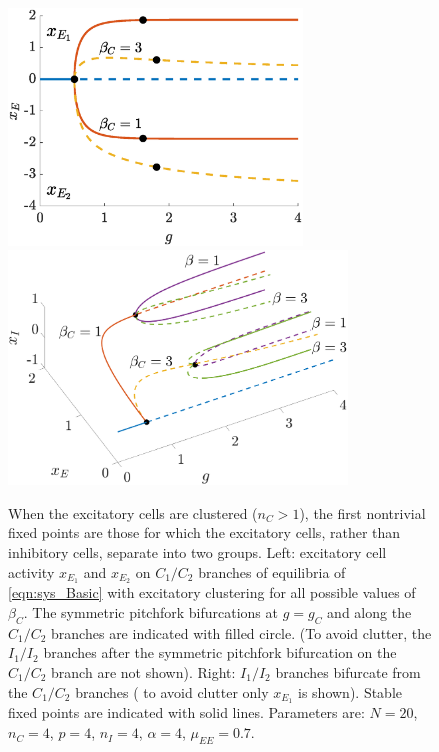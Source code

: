 \documentclass[reqno]{siamonline190516}
\begin{document}
\begin{figure}
    \centering
    \includegraphics[width=7.8cm]{bdclusters20c4E.eps}\hspace{-0.5cm}
    \vspace{-0.5cm}
    \includegraphics[width=9cm]{bdclusters20c4E3D.eps} 
    \caption{When the excitatory cells are clustered ($n_C>1$), the first nontrivial fixed points are those for which the excitatory cells, rather than inhibitory cells, separate into two groups. Left: excitatory cell activity $x_{E_1}$ and $x_{E_2}$ on $C_1/C_2$ branches of equilibria of \cref{eqn:sys_Basic} with excitatory clustering for all possible values of $\beta_C$. The symmetric pitchfork bifurcations at $g = g_C$ and along the $C_1/C_2$ branches are indicated with filled circle. (To avoid clutter, the $I_1/I_2$ branches after the symmetric pitchfork bifurcation on the $C_1/C_2$ branch are not shown). Right: $I_1/I_2$ branches bifurcate from the $C_1/C_2$ branches ( to avoid clutter only $x_{E_1}$ is shown). Stable fixed points are indicated with solid lines. Parameters are: $N = 20$, $n_C = 4$, $p = 4$, $n_I = 4$, $\alpha = 4$, $\mu_{EE} = 0.7$.}
    \label{fig:clusterBD1}
\end{figure}
\end{document}
